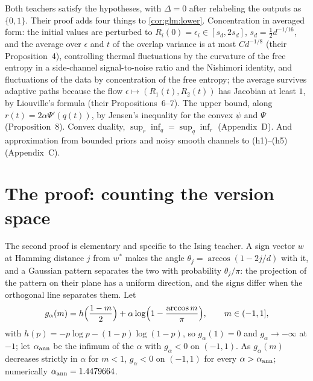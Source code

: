\begin{refsection}
Both teachers satisfy the hypotheses, with $\Delta=0$ after relabeling the outputs as $\{0,1\}$. Their proof adds four things to \cref{cor:glm:lower}. Concentration in averaged form: the initial values are perturbed to $R_i(0)=\epsilon_i\in[s_d,2s_d]$, $s_d=\frac12d^{-1/16}$, and the average over $\epsilon$ and $t$ of the overlap variance is at most $Cd^{-1/8}$ (their Proposition~4), controlling thermal fluctuations by the curvature of the free entropy in a side-channel signal-to-noise ratio and the Nishimori identity, and fluctuations of the data by concentration of the free entropy; the average survives adaptive paths because the flow $\epsilon\mapsto(R_1(t),R_2(t))$ has Jacobian at least $1$, by Liouville's formula (their Propositions~6--7). The upper bound, along $r(t)=2\alpha\Psi'(q(t))$, by Jensen's inequality for the convex $\psi$ and $\Psi$ (Proposition~8). Convex duality, $\sup_r\inf_q=\sup_q\inf_r$ (Appendix~D). And approximation from bounded priors and noisy smooth channels to (h1)--(h5) (Appendix~C).

\section{The proof: counting the version space}\label{sec:glm:counting}

The second proof is elementary and specific to the Ising teacher. A sign vector $w$ at Hamming distance $j$ from $w^*$ makes the angle $\theta_j=\arccos(1-2j/d)$ with it, and a Gaussian pattern separates the two with probability $\theta_j/\pi$: the projection of the pattern on their plane has a uniform direction, and the signs differ when the orthogonal line separates them. Let
\[
g_\alpha(m)=h\Bigl(\frac{1-m}2\Bigr)+\alpha\log\Bigl(1-\frac{\arccos m}\pi\Bigr),\qquad m\in(-1,1],
\]
with $h(p)=-p\log p-(1-p)\log(1-p)$, so $g_\alpha(1)=0$ and $g_\alpha\to-\infty$ at $-1$; let $\alpha_{\mathrm{ann}}$ be the infimum of the $\alpha$ with $g_\alpha<0$ on $(-1,1)$. As $g_\alpha(m)$ decreases strictly in $\alpha$ for $m<1$, $g_\alpha<0$ on $(-1,1)$ for every $\alpha>\alpha_{\mathrm{ann}}$; numerically $\alpha_{\mathrm{ann}}=1.4479664$.

\begin{lemma}[No near neighbors]\label[lemma]{lem:glm:near}
For every $\alpha>0$ there is $\epsilon\in(0,e^{-1}]$ such that if $n\ge\alpha d$, then the expected number of $w\in\glmV\setminus\{w^*\}$ within Hamming distance $\epsilon d$ of $w^*$ is at most $d\,e^{-\alpha\sqrt d/\pi}$.
\end{lemma}


\end{refsection}
